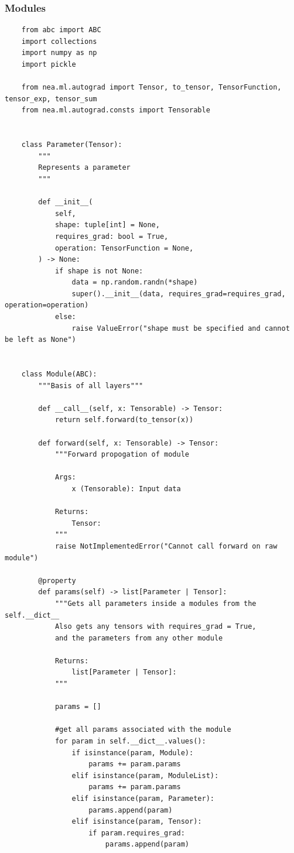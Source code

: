 \documentclass{article}
\begin{document}
    \subsubsection{Modules}
    \begin{verbatim}
    from abc import ABC
    import collections
    import numpy as np
    import pickle

    from nea.ml.autograd import Tensor, to_tensor, TensorFunction, tensor_exp, tensor_sum
    from nea.ml.autograd.consts import Tensorable


    class Parameter(Tensor):
        """
        Represents a parameter
        """

        def __init__(
            self,
            shape: tuple[int] = None,
            requires_grad: bool = True,
            operation: TensorFunction = None,
        ) -> None:
            if shape is not None:
                data = np.random.randn(*shape)
                super().__init__(data, requires_grad=requires_grad, operation=operation)
            else:
                raise ValueError("shape must be specified and cannot be left as None")


    class Module(ABC):
        """Basis of all layers"""

        def __call__(self, x: Tensorable) -> Tensor:
            return self.forward(to_tensor(x))

        def forward(self, x: Tensorable) -> Tensor:
            """Forward propogation of module

            Args:
                x (Tensorable): Input data

            Returns:
                Tensor:
            """
            raise NotImplementedError("Cannot call forward on raw module")

        @property
        def params(self) -> list[Parameter | Tensor]:
            """Gets all parameters inside a modules from the self.__dict__
            Also gets any tensors with requires_grad = True,
            and the parameters from any other module

            Returns:
                list[Parameter | Tensor]:
            """

            params = []

            #get all params associated with the module
            for param in self.__dict__.values():
                if isinstance(param, Module):
                    params += param.params
                elif isinstance(param, ModuleList):
                    params += param.params
                elif isinstance(param, Parameter):
                    params.append(param)
                elif isinstance(param, Tensor):
                    if param.requires_grad:
                        params.append(param)


\end{verbatim}
\end{document}
